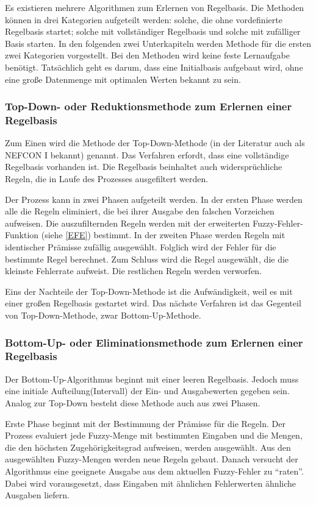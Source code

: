 Es existieren mehrere Algorithmen zum Erlernen von Regelbasis. Die Methoden können in drei Kategorien aufgeteilt werden: solche, die ohne vordefinierte Regelbasis startet; solche mit vollständiger Regelbasis und solche mit zufälliger Basis  starten. In den folgenden zwei Unterkapiteln werden Methode für die ersten zwei Kategorien vorgestellt. Bei den Methoden wird keine feste Lernaufgabe benötigt. Tatsächlich geht es darum, dass eine Initialbasis aufgebaut wird, ohne eine große Datenmenge mit optimalen Werten bekannt zu sein. \cite{CIKruse:15} \cite{UNIMAG:97}%

\subsubsection{Top-Down- oder Reduktionsmethode zum Erlernen einer Regelbasis}

Zum Einen wird die Methode der Top-Down-Methode (in der Literatur auch als NEFCON I bekannt) genannt. Das Verfahren erfordt, dass eine vollständige Regelbasis vorhanden ist. Die Regelbasis beinhaltet auch widersprüchliche Regeln, die in Laufe des Prozesses ausgefiltert werden.

Der Prozess kann in zwei Phasen aufgeteilt werden. In der ersten Phase werden alle die Regeln eliminiert, die bei ihrer Ausgabe den falschen Vorzeichen aufweisen. Die auszufilternden Regeln werden mit der erweiterten Fuzzy-Fehler-Funktion (siehe \ref{EFE}) bestimmt. In der zweiten Phase werden Regeln mit identischer Prämisse zufällig ausgewählt. Folglich wird der Fehler für die bestimmte Regel berechnet. Zum Schluss wird die Regel ausgewählt, die die kleinste Fehlerrate aufweist. Die restlichen Regeln werden verworfen.

Eins der Nachteile der Top-Down-Methode ist die Aufwändigkeit, weil es mit einer großen Regelbasis gestartet wird. Das nächste Verfahren ist das Gegenteil von Top-Down-Methode, zwar Bottom-Up-Methode. \cite{CIKruse:15}


\subsubsection{Bottom-Up- oder Eliminationsmethode zum Erlernen einer Regelbasis}

Der Bottom-Up-Algorithmus beginnt mit einer leeren Regelbasis. Jedoch muss eine initiale Aufteilung(Intervall) der Ein- und Ausgabewerten gegeben sein. Analog zur Top-Down besteht diese Methode auch aus zwei Phasen. 

Erste Phase beginnt mit der Bestimmung der Prämisse für die Regeln. Der Prozess evaluiert jede Fuzzy-Menge mit bestimmten Eingaben und die Mengen, die den höchsten Zugehörigkeitsgrad aufweisen, werden ausgewählt. Aus den ausgewählten Fuzzy-Mengen werden neue Regeln gebaut. Danach versucht der Algorithmus eine geeignete Ausgabe aus dem aktuellen Fuzzy-Fehler zu ``raten''. Dabei wird vorausgesetzt, dass Eingaben mit ähnlichen Fehlerwerten ähnliche Ausgaben liefern.

